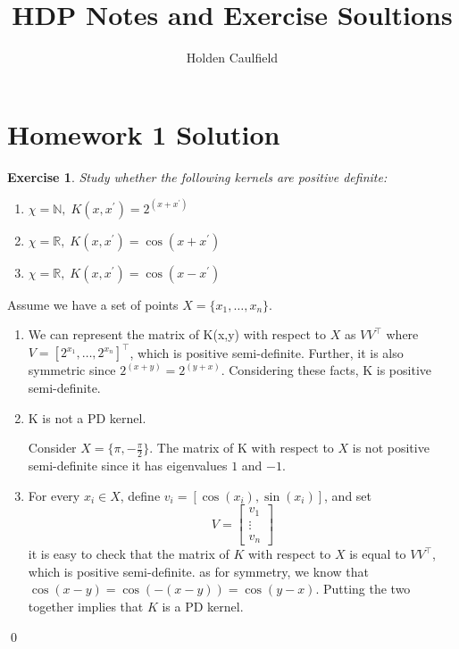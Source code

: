 \documentclass[12pt]{article}
\title{HDP Notes and Exercise Soultions}
\author{Holden Caulfield}
\newtheorem{ex}{Exercise}
\begin{document}
	\centering	\section*{Homework 1 Solution}
	
	\begin{bx}
		
		\begin{ex}
		Study whether the following kernels are positive definite:
		\begin{enumerate}
			\item $\chi = \mathbb{N}, \; K(x,x^\prime)=2^{(x+x^\prime)}$
			\item $\chi = \mathbb{R}, \; K(x,x^\prime)=\cos(x+x^\prime)$
			\item $\chi = \mathbb{R}, \; K(x,x^\prime)=\cos(x-x^\prime)$
		\end{enumerate}
		\end{ex}
		\tcblower
	Assume we have a set of points $X=\{x_1,\dots,x_n\}$.
	\begin{enumerate}
		\item We can represent the matrix of K(x,y) with  respect to $X$ as $VV^\top$ where $V=[2^{x_1},\dots,2^{x_n}]^\top$, which is positive semi-definite. Further, it is also symmetric since $2^{(x+y)}=2^{(y+x)}$. Considering these facts, K is positive semi-definite.
		\item K is not a PD kernel.
		
		Consider $X=\{\pi,-\frac{\pi}{2}\}$.
		The matrix of K with respect to $X$ is not positive semi-definite since it has eigenvalues $1$ and $-1$.
		
		\item For every $x_i \in X$, define $v_i=[\cos(x_i),\sin(x_i)]$, and set 
		\[
		V = \begin{bmatrix}
		v_1 \\
		\vdots \\
		v_n
		\end{bmatrix}
		\]
		it is easy to check that the matrix of $K$ with respect to $X$ is equal to $VV^\top$, which is positive semi-definite.
		as for symmetry, we know that $\cos(x-y)=\cos(-(x-y))=\cos(y-x)$.
		Putting the two together implies that $K$ is a PD kernel.
		
	\end{enumerate}
		\qed
	\end{bx}
	
\end{document}
